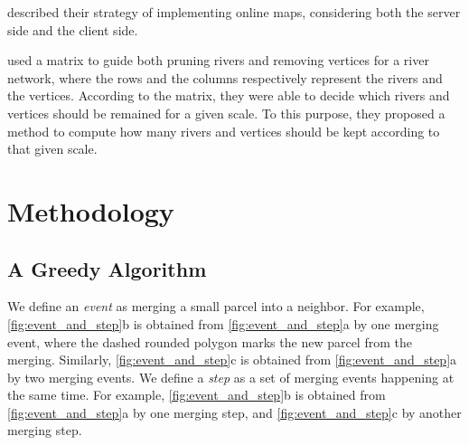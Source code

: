 \documentclass[ijgi,article,submit,moreauthors,pdftex]{Definitions/mdpi}
\begin{document}
\citet{Huang2016Webmap} described their strategy of implementing online maps, 
considering both the server side and the client side.

\citet{Huang2017Matrix} used a matrix to guide 
both pruning rivers and removing vertices for a river network, 
where the rows and the columns respectively represent
the rivers and the vertices.
According to the matrix, 
they were able to decide which rivers and vertices 
should be remained for a given scale.
To this purpose, they proposed a method 
to compute how many rivers and vertices 
should be kept according to that given scale.

\citet{Thiemann2018LandCover}

\citet{Meijers2020Web}



%

\section{Methodology}

\subsection{A Greedy Algorithm}
\label{sec:greedy_algo}




We define an \emph{event} as merging a small parcel into a neighbor.
For example, \fig\ref{fig:event_and_step}b is obtained from 
\fig\ref{fig:event_and_step}a by one merging event,
where the dashed rounded polygon marks the new parcel from the merging.
Similarly, \fig\ref{fig:event_and_step}c is obtained from 
\fig\ref{fig:event_and_step}a by two merging events.
We define a \emph{step} as 
a set of merging events happening at the same time.
For example, \fig\ref{fig:event_and_step}b is obtained from 
\fig\ref{fig:event_and_step}a by one merging step,
and \fig\ref{fig:event_and_step}c by another merging step.
\end{document}
